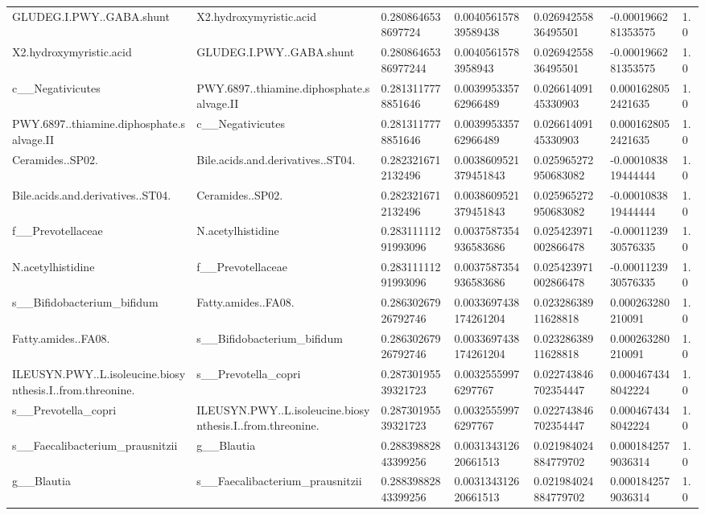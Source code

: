 \begin{longtable}{lllllll}
GLUDEG.I.PWY..GABA.shunt & X2.hydroxymyristic.acid & 0.2808646538697724 & 0.004056157839589438 & 0.02694255836495501 & -0.0001966281353575 & 1.0 \\
X2.hydroxymyristic.acid & GLUDEG.I.PWY..GABA.shunt & 0.28086465386977244 & 0.00405615783958943 & 0.02694255836495501 & -0.0001966281353575 & 1.0 \\
c\_\_Negativicutes & PWY.6897..thiamine.diphosphate.salvage.II & 0.2813117778851646 & 0.003995335762966489 & 0.02661409145330903 & 0.0001628052421635 & 1.0 \\
PWY.6897..thiamine.diphosphate.salvage.II & c\_\_Negativicutes & 0.2813117778851646 & 0.003995335762966489 & 0.02661409145330903 & 0.0001628052421635 & 1.0 \\
Ceramides..SP02. & Bile.acids.and.derivatives..ST04. & 0.2823216712132496 & 0.0038609521379451843 & 0.025965272950683082 & -0.0001083819444444 & 1.0 \\
Bile.acids.and.derivatives..ST04. & Ceramides..SP02. & 0.2823216712132496 & 0.0038609521379451843 & 0.025965272950683082 & -0.0001083819444444 & 1.0 \\
f\_\_Prevotellaceae & N.acetylhistidine & 0.28311111291993096 & 0.0037587354936583686 & 0.025423971002866478 & -0.0001123930576335 & 1.0 \\
N.acetylhistidine & f\_\_Prevotellaceae & 0.28311111291993096 & 0.0037587354936583686 & 0.025423971002866478 & -0.0001123930576335 & 1.0 \\
s\_\_Bifidobacterium\_bifidum & Fatty.amides..FA08. & 0.28630267926792746 & 0.0033697438174261204 & 0.02328638911628818 & 0.000263280210091 & 1.0 \\
Fatty.amides..FA08. & s\_\_Bifidobacterium\_bifidum & 0.28630267926792746 & 0.0033697438174261204 & 0.02328638911628818 & 0.000263280210091 & 1.0 \\
ILEUSYN.PWY..L.isoleucine.biosynthesis.I..from.threonine. & s\_\_Prevotella\_copri & 0.28730195539321723 & 0.00325559976297767 & 0.022743846702354447 & 0.0004674348042224 & 1.0 \\
s\_\_Prevotella\_copri & ILEUSYN.PWY..L.isoleucine.biosynthesis.I..from.threonine. & 0.28730195539321723 & 0.00325559976297767 & 0.022743846702354447 & 0.0004674348042224 & 1.0 \\
s\_\_Faecalibacterium\_prausnitzii & g\_\_Blautia & 0.28839882843399256 & 0.003134312620661513 & 0.021984024884779702 & 0.0001842579036314 & 1.0 \\
g\_\_Blautia & s\_\_Faecalibacterium\_prausnitzii & 0.28839882843399256 & 0.003134312620661513 & 0.021984024884779702 & 0.0001842579036314 & 1.0 \\

\end{longtable}
